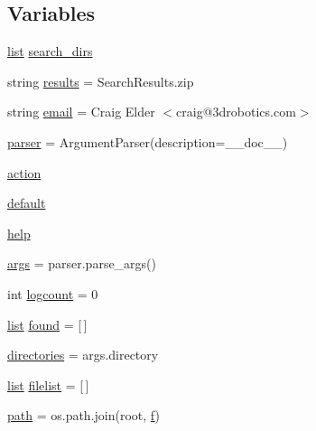 \subsection*{Variables}
\begin{DoxyCompactItemize}
\item 
\mbox{\hyperlink{structlist}{list}} \mbox{\hyperlink{namespacepymavlink_1_1tools_1_1AccelSearch_a3b9f53c9196650011745ba1bd483e584}{search\+\_\+dirs}}
\item 
string \mbox{\hyperlink{namespacepymavlink_1_1tools_1_1AccelSearch_a9a479651d64962eb0d1d91b8e0508a30}{results}} = \textquotesingle{}Search\+Results.\+zip\textquotesingle{}
\item 
string \mbox{\hyperlink{namespacepymavlink_1_1tools_1_1AccelSearch_a34cf6b60e874d51185ab2fc4997c9ef5}{email}} = \textquotesingle{}Craig Elder $<$craig@3drobotics.\+com$>$\textquotesingle{}
\item 
\mbox{\hyperlink{namespacepymavlink_1_1tools_1_1AccelSearch_ad06281c25f5ea505bac4b15673f6ede4}{parser}} = Argument\+Parser(description=\+\_\+\+\_\+doc\+\_\+\+\_\+)
\item 
\mbox{\hyperlink{namespacepymavlink_1_1tools_1_1AccelSearch_a3d70b34e6a21c2df5e3df48dd8777f85}{action}}
\item 
\mbox{\hyperlink{namespacepymavlink_1_1tools_1_1AccelSearch_af62bdada39e5ed5688eb4806078f1a54}{default}}
\item 
\mbox{\hyperlink{namespacepymavlink_1_1tools_1_1AccelSearch_a4d74e7e29e6b7f40261872ea8865404c}{help}}
\item 
\mbox{\hyperlink{namespacepymavlink_1_1tools_1_1AccelSearch_a9f46afe0132c571acbf4f536a68e6276}{args}} = parser.\+parse\+\_\+args()
\item 
int \mbox{\hyperlink{namespacepymavlink_1_1tools_1_1AccelSearch_adfb9f84bfd3c391863e97281c326d0f5}{logcount}} = 0
\item 
\mbox{\hyperlink{structlist}{list}} \mbox{\hyperlink{namespacepymavlink_1_1tools_1_1AccelSearch_a0bca2e9760b6a219df28ce13d7b480b0}{found}} = \mbox{[}$\,$\mbox{]}
\item 
\mbox{\hyperlink{namespacepymavlink_1_1tools_1_1AccelSearch_a209d53c94eb8bf3792bf9e76692b9d49}{directories}} = args.\+directory
\item 
\mbox{\hyperlink{structlist}{list}} \mbox{\hyperlink{namespacepymavlink_1_1tools_1_1AccelSearch_ab9d70abda8675fc388a6a5dd64e15911}{filelist}} = \mbox{[}$\,$\mbox{]}
\item 
\mbox{\hyperlink{namespacepymavlink_1_1tools_1_1AccelSearch_a533fc9b3de465371a337da46d8f3e000}{path}} = os.\+path.\+join(root, \mbox{\hyperlink{namespacepymavlink_1_1tools_1_1AccelSearch_a2127731e1cc2c0698014708e428ffc5e}{f}})

\end{DoxyCompactItemize}
